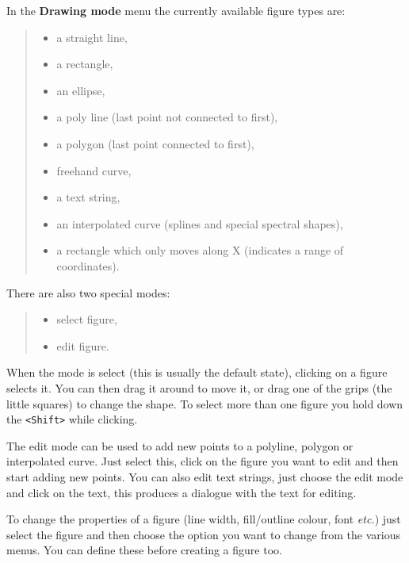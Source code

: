 \documentclass[twoside,11pt]{article}
\newcommand{\htmladdimg}[1]{}
\newcommand{\latexhtml}[2]{#1}
\renewcommand{\_}{\texttt{\symbol{95}}}
\newcommand{\inline}[1]
        {\latexhtml{\texttt{[image: sun243\_figures/\#1.eps]}}
        {\htmladdimg[align=center]{#1.gif}}}
\newcommand{\menuitem}[1]{\textbf{#1}}
\newcommand{\hitext}[1]{\texttt{#1}}
\newcommand{\etc}{\textit{etc.}}
\begin{document}
In the \menuitem{Drawing mode} menu the currently available figure types are:
\begin{quote}
\begin{itemize}
  \item[\inline{line}] a straight line,
  \item[\inline{rectangle}] a rectangle,
  \item[\inline{ellipse}] an ellipse,
  \item[\inline{polyline}] a poly line (last point not connected to first),
  \item[\inline{polygon}] a polygon (last point connected to first),
  \item[\inline{freehand}] freehand curve,
  \item[\inline{text}] a text string,
  \item[\inline{curve}] an interpolated curve (splines and special spectral
                        shapes),
  \item[\inline{xrange}] a rectangle which only moves along X (indicates a
                         range of coordinates).
\end{itemize}
\end{quote}

There are also two special modes:
\begin{quote}
\begin{itemize}
  \item[\inline{select}] select figure,
  \item[\inline{edit}] edit figure.
\end{itemize}
\end{quote}
When the mode is select (this is usually the default state), clicking on a
figure selects it. You can then drag it around to move it, or drag one of the
grips (the little squares) to change the shape. To select more than one figure
you hold down the \hitext{<Shift>} while clicking.

The edit mode can be used to add new points to a polyline, polygon or
interpolated curve. Just select this, click on the figure you want to edit and
then start adding new points. You can also edit text strings, just choose the
edit mode and click on the text, this produces a dialogue with the text for
editing.

To change the properties of a figure (line width, fill/outline colour, font
\etc) just select the figure and then choose the option you want to change
from the various menus. You can define these before creating a figure too.
\end{document}
